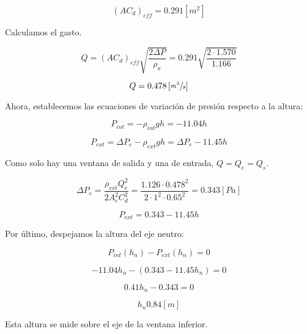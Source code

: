 \documentclass[11pt]{article}
\begin{document}
\[ \left( AC_d \right) _{ eff } = 0.291 \left[ m^2 \right] \]

Calculamos el gasto.

\[ Q = \left( AC_d \right) _{ eff } \sqrt{ \frac{ 2 \Delta P }{ \rho _a } } = 0.291 \sqrt{ \frac{ 2 \cdot 1.570 }{ 1.166 } } \]

\[ Q = 0.478 \left[ \sfrac{ m^3 }{ s } \right] \]

Ahora, establecemos las ecuaciones de variación de presión respecto a la altura:

\[ P_{ int } = - \rho _{ int } g h = -11.04 h \]

\[ P_{ ext } = \Delta P_e - \rho_{ ext } g h = \Delta P_e - 11.45 h \]

Como solo hay una ventana de salida y una de entrada, $ Q = Q_e = Q_s $.

\[ \Delta P_e = \frac{ \rho _{ ext } Q_e^2 }{ 2 A_e^2 C_d^2 } = \frac{ 1.126 \cdot 0.478^2 }{ 2 \cdot 1^2 \cdot 0.65^2} = 0.343 \left[ Pa \right] \]

\[ P_{ ext } = 0.343 - 11.45 h \]

Por último, despejamos la altura del eje neutro:

\[ P_{ int } \left( h_n \right) - P_{ ext } \left( h_n \right) = 0 \]

\[ -11.04 h_n - \left( 0.343 -11.45 h_n \right) = 0 \]

\[ 0.41 h_n - 0.343 = 0 \]

\[ \boxed{ h_n 0.84 \left[ m \right] } \]

Esta altura se mide sobre el eje de la ventana inferior.

\end{document}
